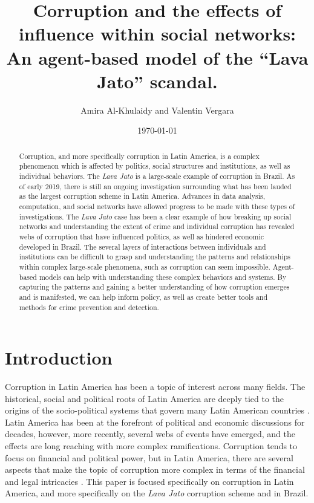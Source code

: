 \documentclass[letterpaper, 11pt]{article}
\author{Amira Al-Khulaidy and Valentin Vergara}
\date{\today}
\title{Corruption and the effects of influence within social networks: An agent-based model of the “Lava Jato” scandal.}
\begin{document}
\maketitle
\begin{abstract}
Corruption, and more specifically corruption in Latin America, is a complex phenomenon which is affected by politics, social structures and institutions, as well as individual behaviors. The \textit{Lava Jato} is a large-scale example of corruption in Brazil. As of early 2019, there is still an ongoing investigation surrounding what has been lauded as the largest corruption scheme in Latin America. Advances in data analysis, computation, and social networks have allowed progress to be made with these types of investigations. The \textit{Lava Jato} case has been a clear example of how breaking up social networks and understanding the extent of crime and individual corruption has revealed webs of corruption that have influenced politics, as well as hindered economic developed in Brazil. The several layers of interactions between individuals and institutions can be difficult to grasp and understanding the patterns and relationships within complex large-scale phenomena, such as corruption can seem impossible. Agent-based models can help with understanding these complex behaviors and systems. By capturing the patterns and gaining a better understanding of how corruption emerges and is manifested, we can help inform policy, as well as create better tools and methods for crime prevention and detection. 
\end{abstract}

\section{Introduction}
\label{sec:orgac54265}

Corruption in Latin America has been a topic of interest across many fields. The historical, social and political roots of Latin America are deeply tied to the origins of the socio-political systems that govern many Latin American countries \citep{weyland1998}. Latin America has been at the forefront of political and economic discussions for decades, however, more recently, several webs of events have emerged, and the effects are long reaching with more complex ramifications. Corruption tends to focus on financial and political power, but in Latin America, there are several  aspects that make the topic of corruption more complex in terms of the financial and legal intricacies \citep{goldstein2018}. This paper is focused specifically on corruption in Latin America, and more specifically on the \emph{Lava Jato} corruption scheme and in Brazil. 
\end{document}
